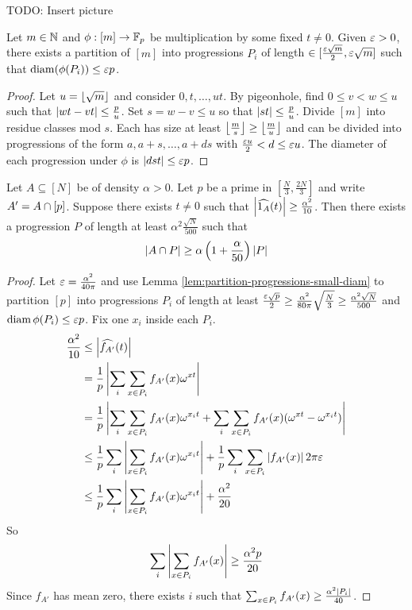 \documentclass{article}
\begin{document}
TODO: Insert picture

\begin{lem}\label{lem:partition-progressions-small-diam}
  Let $m \in \mathbb N$ and $\phi : [m] \to \mathbb F_p$ be multiplication by some fixed $t \ne 0$. Given $\varepsilon > 0$, there exists a partition of $[m]$ into progressions $P_i$ of length $\in [\frac{\varepsilon\sqrt m}2, \varepsilon\sqrt m]$ such that $\operatorname{diam}(\phi(P_i)) \le \varepsilon p$.
\end{lem}
\begin{proof}
  Let $u = \left\lfloor \sqrt m\right\rfloor$ and consider $0, t, \dots, ut$. By pigeonhole, find $0 \le v < w \le u$ such that $\left\lvert wt - vt\right\rvert \le \frac pu$. Set $s = w - v \le u$ so that $\left\lvert st\right\rvert \le \frac pu$. Divide $[m]$ into residue classes mod $s$. Each has size at least $\left\lfloor \frac ms\right\rfloor \ge \left\lfloor \frac mu\right\rfloor$ and can be divided into progressions of the form $a, a + s, \dots, a + ds$ with $\frac{\varepsilon u}2 < d \le \varepsilon u$. The diameter of each progression under $\phi$ is $\left\lvert dst\right\rvert \le \varepsilon p$.
\end{proof}

\begin{lem}
  Let $A \subseteq [N]$ be of density $\alpha > 0$. Let $p$ be a prime in $[\frac N3, \frac{2N}3]$ and write $A' = A \cap [p]$. Suppose there exists $t \ne 0$ such that $\left\lvert \widehat{1_A}(t)\right\rvert \ge \frac{\alpha^2}{10}$. Then there exists a progression $P$ of length at least $\alpha^2 \frac{\sqrt N}{500}$ such that
  $$\left\lvert A \cap P\right\rvert \ge \alpha\left(1 + \frac\alpha{50}\right)\left\lvert P\right\rvert$$
\end{lem}
\begin{proof}
  Let $\varepsilon = \frac{\alpha^2}{40\pi}$ and use Lemma \ref{lem:partition-progressions-small-diam} to partition $[p]$ into progressions $P_i$ of length at least $\frac{\varepsilon \sqrt p}2 \ge \frac{\alpha^2}{80\pi}\sqrt{\frac N3} \ge \frac{\alpha^2\sqrt N}{500}$ and $\operatorname{diam} \phi(P_i) \le \varepsilon p$. Fix one $x_i$ inside each $P_i$.
  \begin{align*}
    \frac{\alpha^2}{10}
    & \le \left\lvert \widehat{f_{A'}}(t)\right\rvert \\
    & = \frac 1p\left\lvert \sum_i\sum_{x \in P_i} f_{A'}(x)\omega^{xt}\right\rvert \\
    & = \frac 1p\left\lvert \sum_i\sum_{x \in P_i} f_{A'}(x)\omega^{x_it} + \sum_i\sum_{x \in P_i} f_{A'}(x)(\omega^{xt} - \omega^{x_it})\right\rvert \\
    & \le \frac 1p\sum_i\left\lvert \sum_{x \in P_i} f_{A'}(x)\omega^{x_it}\right\rvert + \frac 1p\sum_i\sum_{x \in P_i} \left\lvert f_{A'}(x)\right\rvert 2\pi\varepsilon \\
    & \le \frac 1p\sum_i\left\lvert \sum_{x \in P_i} f_{A'}(x)\omega^{x_it}\right\rvert + \frac{\alpha^2}{20}
  \end{align*}
  So
  $$\sum_i \left\lvert \sum_{x \in P_i} f_{A'}(x)\right\rvert \ge \frac{\alpha^2p}{20}$$
  Since $f_{A'}$ has mean zero, there exists $i$ such that $\sum_{x \in P_i} f_{A'}(x) \ge \frac{\alpha^2\left\lvert P_i\right\rvert}{40}$.
\end{proof}
\end{document}
